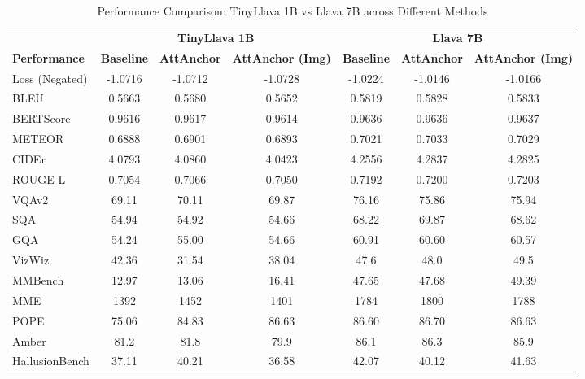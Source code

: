 \documentclass[11pt]{article}
\begin{document}
\begin{table}[H]
\centering
\caption{Performance Comparison: TinyLlava 1B vs Llava 7B across Different Methods}
\scriptsize
\begin{tabular}{@{}l|ccc|ccc@{}}
\toprule
& \multicolumn{3}{c|}{\textbf{TinyLlava 1B}} & \multicolumn{3}{c}{\textbf{Llava 7B}} \\
\textbf{Performance} & \textbf{Baseline} & \textbf{AttAnchor} & \textbf{AttAnchor (Img)} & \textbf{Baseline} & \textbf{AttAnchor} & \textbf{AttAnchor (Img)} \\
\midrule
Loss (Negated) & -1.0716 & \textcolor{customgreen}{-1.0712} & -1.0728 & -1.0224 & \textcolor{customgreen}{-1.0146} & -1.0166 \\
BLEU & 0.5663 & \textcolor{customgreen}{0.5680} & 0.5652 & 0.5819 & 0.5828 & \textcolor{customgreen}{0.5833} \\
BERTScore & 0.9616 & \textcolor{customgreen}{0.9617} & 0.9614 & 0.9636 & 0.9636 & \textcolor{customgreen}{0.9637} \\
METEOR & 0.6888 & \textcolor{customgreen}{0.6901} & 0.6893 & 0.7021 & \textcolor{customgreen}{0.7033} & 0.7029 \\
CIDEr & 4.0793 & \textcolor{customgreen}{4.0860} & 4.0423 & 4.2556 & \textcolor{customgreen}{4.2837} & 4.2825 \\
ROUGE-L & 0.7054 & \textcolor{customgreen}{0.7066} & 0.7050 & 0.7192 & 0.7200 & \textcolor{customgreen}{0.7203} \\

VQAv2 & 69.11 & \textcolor{customgreen}{70.11} & 69.87 & \textcolor{customgreen}{76.16} & 75.86 & 75.94 \\
SQA & \textcolor{customgreen}{54.94} & 54.92 & 54.66 & 68.22 & \textcolor{customgreen}{69.87} & 68.62 \\
GQA & 54.24 & \textcolor{customgreen}{55.00} & 54.66 & \textcolor{customgreen}{60.91} & 60.60 & 60.57 \\
VizWiz & \textcolor{customgreen}{42.36} & 31.54 & 38.04 & 47.6 & 48.0 & \textcolor{customgreen}{49.5} \\

MMBench & 12.97 & 13.06 & \textcolor{customgreen}{16.41} & 47.65 & 47.68 & \textcolor{customgreen}{49.39} \\
MME & 1392 & \textcolor{customgreen}{1452} & 1401 & 1784 & \textcolor{customgreen}{1800} & 1788 \\

POPE & 75.06 & 84.83 & \textcolor{customgreen}{86.63} & 86.60 & \textcolor{customgreen}{86.70} & 86.63 \\
Amber & 81.2 & \textcolor{customgreen}{81.8} & 79.9 & 86.1 & \textcolor{customgreen}{86.3} & 85.9 \\
HallusionBench & 37.11 & \textcolor{customgreen}{40.21} & 36.58 & \textcolor{customgreen}{42.07} & 40.12 & 41.63 \\


\bottomrule
\end{tabular}
\label{tab:model_comparison}
\end{table}
\vspace{-0.7cm}
\end{document}
